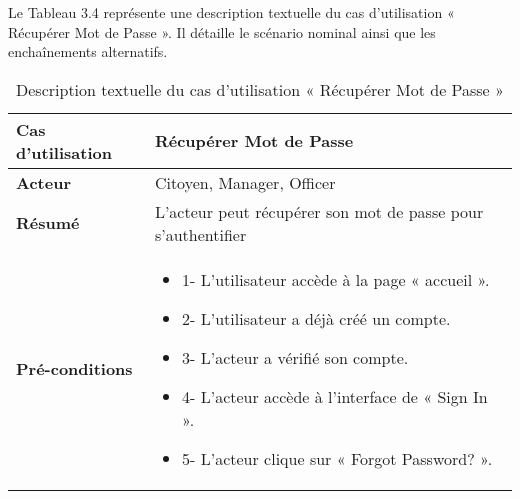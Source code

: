 Le Tableau 3.4 représente une description textuelle du cas d'utilisation « Récupérer Mot de Passe ». Il détaille le scénario nominal ainsi que les enchaînements alternatifs.
\begin{longtable}{|>{\arraybackslash}p{4.2cm}|>{\arraybackslash}p{12.5cm}|}
\caption{\centering Description textuelle du cas d'utilisation « Récupérer Mot de Passe »}
\label{tab:backlog} \\
\hline
\rowcolor{gray!30}
\textbf{Cas d'utilisation} &  Récupérer Mot de Passe \\
\hline
\endfirsthead

\hline
\endhead

\hline
\endfoot

\hline \hline
\endlastfoot
\textbf{Acteur} & Citoyen, Manager, Officer \\
\hline
\textbf{Résumé} &  L'acteur peut récupérer son mot de passe pour s'authentifier \\
\hline
\textbf{Pré-conditions} &

\begin{itemize}[label=]
\item{1-} L'utilisateur accède à la page « accueil ».
\item{2-} L'utilisateur a déjà créé un compte.
\item{3-} L'acteur a vérifié son compte.
\item{4-} L'acteur accède à l'interface de « Sign In ».
\item{5-} L'acteur clique sur « Forgot Password? ».
\end{itemize}


\end{longtable}
